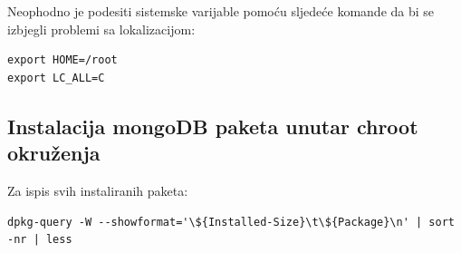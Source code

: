 \documentclass[12pt,vi]{mitthesis}
\begin{document}
\noindent
Neophodno je podesiti sistemske varijable pomoću sljedeće komande da bi se izbjegli problemi sa lokalizacijom:
\begin{lstlisting}[style=BashInputStyle]
export HOME=/root
export LC_ALL=C
\end{lstlisting}

\subsection*{Instalacija mongoDB paketa unutar chroot okruženja}
\noindent
Za ispis svih instaliranih paketa:
\begin{lstlisting}[style=BashInputStyle]
dpkg-query -W --showformat='\${Installed-Size}\t\${Package}\n' | sort -nr | less
\end{lstlisting}
\end{document}
